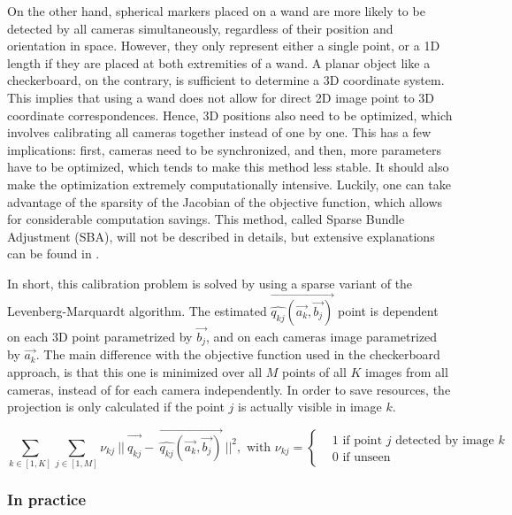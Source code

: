 On the other hand, spherical markers placed on a wand are more likely to be detected by all cameras simultaneously, regardless of their position and orientation in space. However, they only represent either a single point, or a 1D length if they are placed at both extremities of a wand. A planar object like a checkerboard, on the contrary, is sufficient to determine a 3D coordinate system. This implies that using a wand does not allow for direct 2D image point to 3D coordinate correspondences. Hence, 3D positions also need to be optimized, which involves calibrating all cameras together instead of one by one. This has a few implications: first, cameras need to be synchronized, and then, more parameters have to be optimized, which tends to make this method less stable. It should also make the optimization extremely computationally intensive. Luckily, one can take advantage of the sparsity of the Jacobian of the objective function, which allows for considerable computation savings. This method, called Sparse Bundle Adjustment (SBA), will not be described in details, but extensive explanations can be found in \cite{Lourakis2009}.

\newpage
In short, this calibration problem is solved by using a sparse variant of the Levenberg-Marquardt algorithm.  The estimated $\overrightarrow{\widehat{q_{kj}}(\overrightarrow{a_k}, \overrightarrow{b_j})}$ point is dependent on each 3D point parametrized by $\overrightarrow{b_j}$, and on each cameras image parametrized by $\overrightarrow{a_k}$. The main difference with the objective function used in the checkerboard approach, is that this one is minimized over all $M$ points of all $K$ images from all cameras, instead of for each camera independently. In order to save resources, the projection is only calculated if the point $j$ is actually visible in image $k$.

\begin{equation}
  \sum_{k \in [1,K]} \sum_{j \in [1,M]} 
  \nu_{kj} \ ||\ \overrightarrow{q_{kj}^{\ ^{\ ^{\ ^{\ }}}}} - \ 
  \overrightarrow{\widehat{q_{kj}}(\overrightarrow{a_k}, \overrightarrow{b_j})}\ 
  ||^2,  
  \textrm{ with }  
  \nu_{kj} = 
    \begin{cases}
        & 1 \textrm{ if point } j \textrm{ detected by image } k \\
        & 0 \textrm{ if unseen}
    \end{cases}
\end{equation} 


\subsubsection{In practice}  

